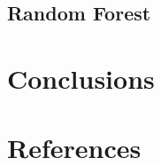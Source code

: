 \documentclass[preprint,12pt]{elsarticle}
\begin{document}


\subsection{Random Forest}

\section{Conclusions}



\section{References}








\end{document}

